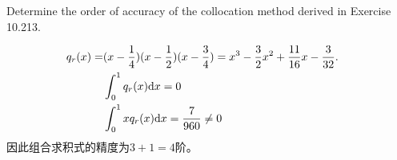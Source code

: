 \documentclass[lang=cn,a4paper,newtx,bibend=bibtex]{elegantpaper}
\begin{document}
\begin{prob}[Exercise 10.220]
  Determine the order of accuracy of the collocation method derived in Exercise 10.213.
\end{prob}

\begin{solution}
  \begin{equation*}
    \begin{aligned}
      q_r(x) = & (x-\frac 14)(x-\frac 12)(x-\frac 34) = x^3 - \frac 32 x^2 + \frac{11}{16} x - \frac{3}{32}. & \\
      & \int_{0}^{1}{q_r(x)}{\mathrm{d} {x}} = 0 & \\
      & \int_{0}^{1}{xq_r(x)}{\mathrm{d} {x}} =  \frac{7}{960} \neq 0 & \\
    \end{aligned}
  \end{equation*}
  因此组合求积式的精度为$3+1=4$阶。
\end{solution}

\nocite{*}
\printbibliography[heading=bibintoc, title=\ebibname]
\end{document}
